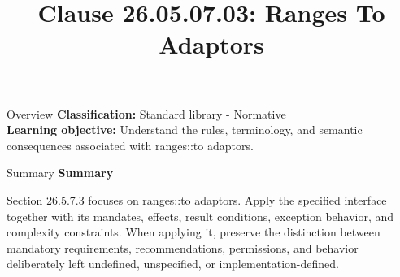\documentclass[10pt,letterpaper]{article}
\title{Clause 26.05.07.03: Ranges To Adaptors}
\author{}
\date{}
\begin{document}
\maketitle
\begin{CornellOverviewBox}{Overview}
\textbf{Classification:} Standard library - Normative\\[2pt]
\textbf{Learning objective:} Understand the rules, terminology, and semantic consequences associated with ranges::to adaptors.
\end{CornellOverviewBox}\begin{CornellSummaryBox}{Summary}
{\sffamily\bfseries\color{Accent} Summary}\par\vspace{3pt}Section 26.5.7.3 focuses on ranges::to adaptors. Apply the specified interface together with its mandates, effects, result conditions, exception behavior, and complexity constraints. When applying it, preserve the distinction between mandatory requirements, recommendations, permissions, and behavior deliberately left undefined, unspecified, or implementation-defined.
\end{CornellSummaryBox}
\end{document}
